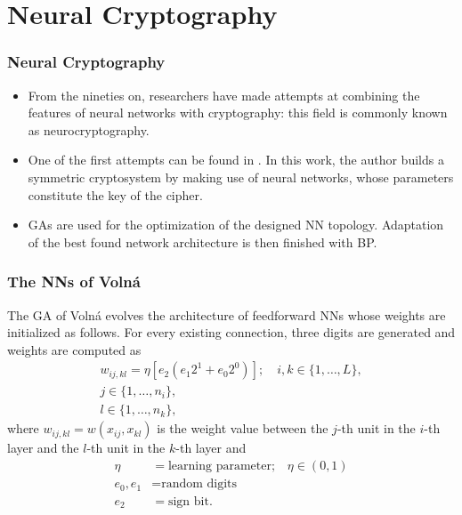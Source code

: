 \documentclass{beamer}
\begin{document}
\section{Neural Cryptography}
\begin{frame} %
\frametitle{Neural Cryptography}
\begin{itemize}
\item From the nineties on, researchers have made attempts at combining the features of neural networks with cryptography: this field is commonly known as neurocryptography.
\item One of the first attempts can be found in \cite{volna}. In this work, the author builds a symmetric cryptosystem by making use of neural networks, whose parameters constitute the key of the cipher.
\item GAs are used for the optimization of the designed NN topology. Adaptation of the best found network architecture is then finished with BP.
\end{itemize}
\end{frame}
\begin{frame}
\frametitle{The NNs of Volná}
The GA of Volná evolves the architecture of feedforward NNs whose weights are initialized as follows. For every existing connection, three digits are generated and weights are computed as 
\begin{align*}
w_{ij,kl} = \eta[e_2(e_1 2^1 + e_0 2^0)]; \quad i,k\in\{1,\dots,L\}, \\
  j\in\{1,\dots, n_i\}, \\
  l \in\{1, \dots, n_k\},
\end{align*}
where $w_{ij,kl} = w(x_{ij}, x_{kl})$ is the weight value between the $j$-th unit in the $i$-th layer and the $l$-th unit in the $k$-th layer and
\begin{align*}
    \eta &= \text{learning parameter;} \quad \eta \in (0,1)\\
    e_0, e_1 &= \text{random digits} \\
  	e_2 &= \text{sign bit}.
\end{align*}
\end{frame}
\end{document}
